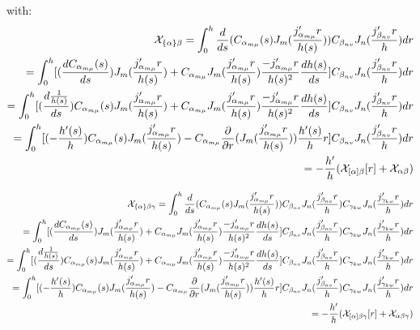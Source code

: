 \documentclass{Note}
\begin{document}
with:
\begin{equation}
\begin{aligned}
\mathcal{X}_{\{\alpha\}\beta}=\int_0^h {d\over ds}(C_{\alpha_{m\mu}}(s) J_m({j'_{\alpha_{m\mu}}r\over h(s)}))C_{\beta_{nv}} J_n({j'_{\beta_{nv}}r\over h})dr\\
=\int_0^h [({dC_{\alpha_{m\mu}}(s)\over ds})J_m({j'_{\alpha_{m\mu}}r\over h(s)})+
C_{\alpha_{m\mu}} J_m({j'_{\alpha_{m\mu}}r\over h(s)}) {-j'_{\alpha_{m\mu}}r\over h(s)^2}{dh(s)\over ds}]C_{\beta_{nv}} J_n({j'_{\beta_{nv}}r\over h})dr\\
=\int_0^h [({d{1\over h(s)}\over ds}){C_{\alpha_{m\mu}}(s)} J_m({j'_{\alpha_{m\mu}}r\over h(s)})+
C_{\alpha_{m\mu}} J_m({j'_{\alpha_{m\mu}}r\over h(s)}) {-j'_{\alpha_{m\mu}}r\over h(s)^2}{dh(s)\over ds}]C_{\beta_{nv}} J_n({j'_{\beta_{nv}}r\over h})dr\\
=\int_0^h [(-{h'(s)\over h}){C_{\alpha_{m\mu}}(s) } J_m({j'_{\alpha_{m\mu}}r\over h(s)})-
C_{\alpha_{m\mu}} {\partial \over \partial r}(J_m({j'_{\alpha_{m\mu}}r\over h(s)})) {h'(s)\over h}r]C_{\beta_{nv}} J_n({j'_{\beta_{nv}}r\over h})dr\\
=-{h'\over h}(\mathcal{X}_{[\alpha]\beta}[r]+\mathcal{X}_{\alpha\beta})
\end{aligned}
\end{equation}

\begin{equation}
\begin{aligned}
\mathcal{X}_{\{\alpha\}\beta\gamma}=\int_0^h {d\over ds}(C_{\alpha_{m\mu}}(s) J_m({j'_{\alpha_{m\mu}}r\over h(s)}))C_{\beta_{nv}} J_n({j'_{\beta_{nv}}r\over h})C_{\gamma_{kw}} J_n({j'_{\gamma_{kw}}r\over h})dr\\
=\int_0^h [({dC_{\alpha_{m\mu}}(s)\over ds})J_m({j'_{\alpha_{m\mu}}r\over h(s)})+
C_{\alpha_{m\mu}} J_m({j'_{\alpha_{m\mu}}r\over h(s)}) {-j'_{\alpha_{m\mu}}r\over h(s)^2}{dh(s)\over ds}]C_{\beta_{nv}} J_n({j'_{\beta_{nv}}r\over h})C_{\gamma_{kw}} J_n({j'_{\gamma_{kw}}r\over h})dr\\
=\int_0^h [({d{1\over h(s)}\over ds}){C_{\alpha_{m\mu}}(s)} J_m({j'_{\alpha_{m\mu}}r\over h(s)})+
C_{\alpha_{m\mu}} J_m({j'_{\alpha_{m\mu}}r\over h(s)}) {-j'_{\alpha_{m\mu}}r\over h(s)^2}{dh(s)\over ds}]C_{\beta_{nv}} J_n({j'_{\beta_{nv}}r\over h})C_{\gamma_{kw}} J_n({j'_{\gamma_{kw}}r\over h})dr\\
=\int_0^h [(-{h'(s)\over h}){C_{\alpha_{m\mu}}(s) } J_m({j'_{\alpha_{m\mu}}r\over h(s)})-
C_{\alpha_{m\mu}} {\partial \over \partial r}(J_m({j'_{\alpha_{m\mu}}r\over h(s)})) {h'(s)\over h}r]C_{\beta_{nv}} J_n({j'_{\beta_{nv}}r\over h})C_{\gamma_{kw}} J_n({j'_{\gamma_{kw}}r\over h})dr\\
=-{h'\over h}(\mathcal{X}_{[\alpha]\beta\gamma}[r]+\mathcal{X}_{\alpha\beta\gamma})
\end{aligned}
\end{equation}
\end{document}
